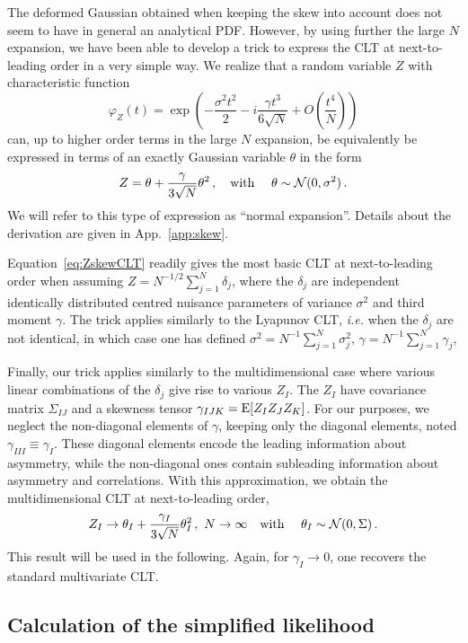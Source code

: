 \documentclass[11pt]{article}
\newcommand{\be}{\begin{equation}}
\newcommand{\ee}{\end{equation}}
\begin{document}
The deformed Gaussian obtained when keeping the skew into account does not seem to have in general an analytical PDF. However, by using further the large $N$  expansion, we have been able to develop a  trick to express the CLT at next-to-leading order in a very simple way. We realize that a random variable $Z$ with characteristic function
\be
\varphi_Z(t)=\exp\left(-\frac{\sigma^2 t^2}{2}-i \frac{\gamma t^3}{6 \sqrt{N}} +O\left(\frac{t^4}{N}\right)\right) \label{eq:CF_CLT}
 \ee
can, up to higher order terms in the large $N$ expansion, be equivalently be expressed in terms of an exactly Gaussian variable $\theta$ in the form
\be
Z= \theta+\frac{\gamma}{3\sqrt{N}}\theta^2\,,  \quad \textrm{with } \quad \theta\sim{\cal N}(0,\sigma^2)\,. \label{eq:ZskewCLT}
\ee
We will refer to this type of expression as ``normal expansion''. Details about the derivation are given in App.~\ref{app:skew}.


Equation~\eqref{eq:ZskewCLT}  readily gives the most basic CLT at next-to-leading order when assuming $Z=N^{-1/2}\sum_{j=1}^N \delta_j$, where the $\delta_j$ are  independent identically distributed centred nuisance parameters  of variance $\sigma^2$ and third moment $\gamma$. The trick applies similarly to the Lyapunov CLT, \textit{i.e.} when the $\delta_j$ are not identical, in which case one has defined $\sigma^2=N^{-1}\sum_{j=1}^N \sigma_j^2$, $\gamma=N^{-1}\sum_{j=1}^N \gamma_j$,

Finally, our trick applies similarly to the multidimensional case where various linear combinations of the $\delta_j$ give rise to various $Z_I$. The $Z_I$ have covariance matrix $\Sigma_{IJ}$ and a skewness tensor $\gamma_{IJK}={\rm E}[Z_IZ_JZ_K]$. For our purposes, we neglect the non-diagonal elements of $\gamma$, keeping only  the diagonal elements, noted $\gamma_{III}\equiv \gamma_I$. These diagonal elements encode the leading information about asymmetry, while the non-diagonal ones contain subleading information about asymmetry and correlations. With this approximation, we obtain the multidimensional CLT at next-to-leading order,
\be
Z_I\rightarrow \theta_I+\frac{\gamma_{I}}{3\sqrt{N}}\theta_I^2\,,\,\,N\rightarrow \infty  \quad \textrm{with } \quad \theta_I\sim{\cal N}(0,\Sigma)\,. \label{eq:NLCFT}
\ee
 This  result will be used in the following. Again, for $\gamma_I\rightarrow 0$, one recovers the standard multivariate CLT.





\subsection{Calculation of the simplified likelihood}
\label{se:analytic}
\end{document}
